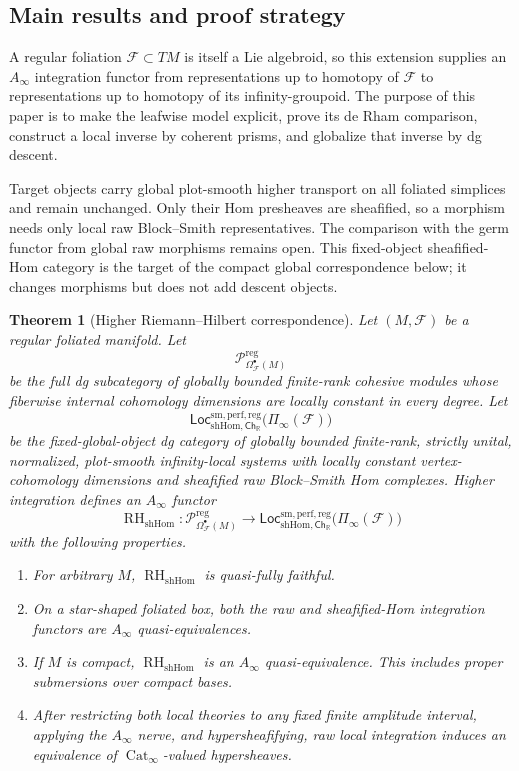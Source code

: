 \documentclass[12pt]{amsart}
\newtheorem{theorem}{Theorem}[section]
\theoremstyle{definition}
\theoremstyle{remark}
\numberwithin{equation}{section}
\newcommand{\CF}{{\mathcal F}}
\newcommand{\R}{{\mathbb{R}}}
\newcommand{\1}{{\mathbb{1}}}
\newcommand{\Ch}{\mathsf{Ch}}
\newcommand{\Loc}{\mathsf{Loc}}
\newcommand{\RH}{\operatorname{RH}}
\begin{document}
\subsection{Main results and proof strategy}

A regular foliation $\CF\subset TM$ is itself a Lie algebroid, so this
extension supplies an $A_{\infty}$ integration functor from
representations up to homotopy of $\CF$ to representations up to
homotopy of its infinity-groupoid.  The purpose of this paper is to make
the leafwise model explicit, prove its de Rham comparison, construct a
local inverse by coherent prisms, and globalize that inverse by dg
descent.

Target objects carry global plot-smooth higher transport on all
foliated simplices and remain unchanged.  Only their Hom presheaves
are sheafified, so a morphism needs only local raw Block--Smith
representatives.  The comparison with the germ functor from global raw
morphisms remains open.  This fixed-object sheafified-Hom category is
the target of the compact global correspondence below; it changes
morphisms but does not add descent objects.

\begin{theorem}[Higher Riemann--Hilbert correspondence]
\label{thm:intro-main}
Let $(M,\CF)$ be a regular foliated manifold.  Let
\[
 \mathcal P_{\Omega^\bullet_{\CF}(M)}^{\mathrm{reg}}
\]
be the full dg subcategory of globally bounded finite-rank cohesive
modules whose fiberwise internal cohomology dimensions are locally
constant in every degree.  Let
\[
 \Loc_{\mathrm{shHom},\Ch_{\R}}^{\mathrm{sm,perf,reg}}
 \bigl(\Pi_\infty(\CF)\bigr)
\]
be the fixed-global-object dg category of globally bounded
finite-rank, strictly unital, normalized, plot-smooth infinity-local
systems with locally constant vertex-cohomology dimensions and
sheafified raw Block--Smith Hom complexes.  Higher integration defines
an $A_\infty$ functor
\[
 \RH_{\mathrm{shHom}}:
 \mathcal P_{\Omega^\bullet_{\CF}(M)}^{\mathrm{reg}}
 \longrightarrow
 \Loc_{\mathrm{shHom},\Ch_{\R}}^{\mathrm{sm,perf,reg}}
 \bigl(\Pi_\infty(\CF)\bigr)
\]
with the following properties.
\begin{enumerate}
 \item For arbitrary $M$, $\RH_{\mathrm{shHom}}$ is quasi-fully
 faithful.
 \item On a star-shaped foliated box, both the raw and
 sheafified-Hom integration functors are $A_\infty$
 quasi-equivalences.
 \item If $M$ is compact, $\RH_{\mathrm{shHom}}$ is an $A_\infty$
 quasi-equivalence.  This includes proper submersions over compact
 bases.
 \item After restricting both local theories to any fixed finite
 amplitude interval, applying the $A_\infty$ nerve, and
 hypersheafifying, raw local integration induces an equivalence of
 $\operatorname{Cat}_\infty$-valued hypersheaves.
\end{enumerate}
\end{theorem}
\end{document}
